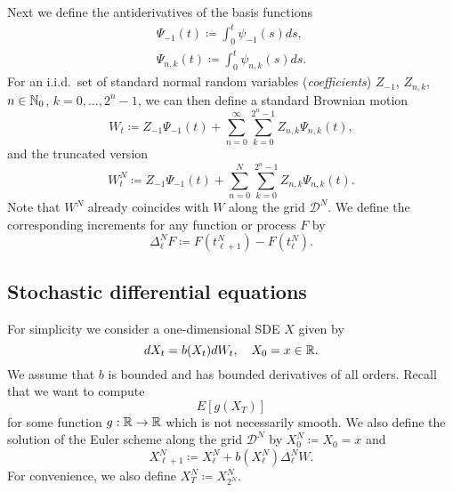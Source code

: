 Next we define the antiderivatives of the basis functions
\begin{subequations}
  \label{eq:Haar-int-basis}
  \begin{gather}
    \label{eq:Haar-int-constant}
    \Psi_{-1}(t) \coloneqq \int_0^t \psi_{-1}(s) ds, \\
    \label{eq:Haar-int-nonconstant}
    \Psi_{n,k}(t) \coloneqq \int_0^t \psi_{n,k}(s) ds.
  \end{gather}
\end{subequations}
For an i.i.d.~set of standard normal random variables (\emph{coefficients})
$Z_{-1}$, $Z_{n,k}$, $n \in \mathbb{N}_0$, $k = 0, \ldots, 2^n-1$, we can then define
a standard Brownian motion
\begin{equation}
  \label{eq:Brownian-motion}
  W_t \coloneqq Z_{-1} \Psi_{-1}(t) + \sum_{n=0}^\infty \sum_{k=0}^{2^n-1}
  Z_{n,k} \Psi_{n,k}(t),
\end{equation}
and the truncated version
\begin{equation}
  \label{eq:Brownian-motion-truncated}
  W_t^N \coloneqq Z_{-1} \Psi_{-1}(t) + \sum_{n=0}^N \sum_{k=0}^{2^n-1}
  Z_{n,k} \Psi_{n,k}(t).
\end{equation}
Note that $W^N$ already coincides with $W$ along the grid $\mathcal{D}^N$. We
define the corresponding increments for any function or process $F$ by
\begin{equation}
  \label{eq:increments}
  \Delta^N_\ell F \coloneqq F(t^N_{\ell+1}) - F(t^N_\ell).
\end{equation}

\subsection{Stochastic differential equations}
\label{sec:stoch-diff-equat}

For simplicity we consider a one-dimensional SDE $X$ given by
\begin{equation}
  \label{eq:SDE}
  dX_t = b(X_t) dW_t, \quad X_0 = x \in \mathbb{R}.
\end{equation}
We assume that $b$ is bounded and has bounded derivatives of all
orders. Recall that we want to compute
\begin{equation*}
  E\left[ g\left( X_T \right) \right]
\end{equation*}
for some function $g : \mathbb{R} \to \mathbb{R}$ which is not necessarily smooth.
We also define the solution of the Euler scheme along the grid $\mathcal{D}^N$
by $X^N_0 \coloneqq X_0 = x$ and
\begin{equation}
  \label{eq:euler}
  X^N_{\ell+1} \coloneqq X^N_\ell + b\left( X^N_{\ell} \right) \Delta^N_\ell W.
\end{equation}
For convenience, we also define $X^N_T \coloneqq X^N_{2^N}$.

